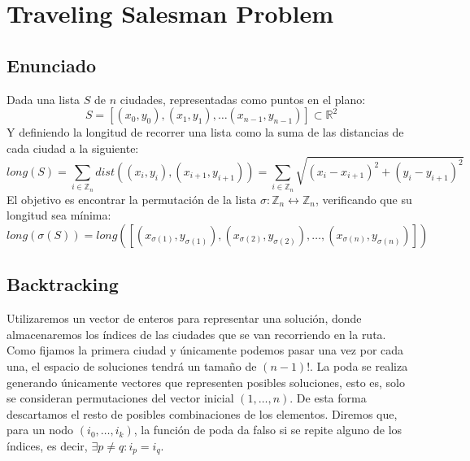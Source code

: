 \documentclass[a4paper, 11pt]{article} %
\begin{document}
	    \small
	    \texttt{}
	    \normalsize

    
    
    \section{Traveling Salesman Problem}
      \subsection{Enunciado}
	Dada una lista $S$ de $n$ ciudades, representadas como puntos en el plano:
	\begin{equation}
	    S = [(x_0,y_0), (x_1,y_1), \dots (x_{n-1},y_{n-1})] \subset \mathbb{R}^2
	\end{equation}
	Y definiendo la longitud de recorrer una lista como la suma de las distancias de cada ciudad a la siguiente:
	\begin{equation}
	    long(S) = \sum_{i \in \mathbb{Z}_n} dist((x_i,y_i), (x_{i+1}, y_{i+1})) = \sum_{i \in \mathbb{Z}_n} \sqrt{(x_i-x_{i+1})^2 + (y_i-y_{i+1})^2}
	\end{equation}
	El objetivo es encontrar la permutación de la lista $\sigma : \mathbb{Z}_n \leftrightarrow \mathbb{Z}_n$, verificando que su longitud sea mínima:
	\begin{equation}
	    long(\sigma(S)) = long([(x_{\sigma(1)},y_{\sigma(1)}), (x_{\sigma(2)},y_{\sigma(2)}), \dots, (x_{\sigma(n)},y_{\sigma(n)})])
    \end{equation}
    
      \subsection{Backtracking}
	Utilizaremos un vector de enteros para representar una solución, donde almacenaremos los 
	índices de las ciudades que se van recorriendo en la ruta. Como fijamos la primera ciudad 
	y únicamente podemos pasar una vez por cada una, el espacio de soluciones tendrá un tamaño 
	de $(n-1)!$.
	La poda se realiza generando únicamente vectores que representen posibles soluciones, esto es, 
	solo se consideran permutaciones del vector inicial $(1,\dots,n)$. De esta forma descartamos el 
	resto de posibles combinaciones de los elementos. Diremos que, para un nodo $(i_0, \dots, i_k)$, 
	la función de poda da falso si se repite alguno de los índices, es decir, $\exists p\ne q : i_p = i_q$.
    
    \newpage
    
\end{document}
